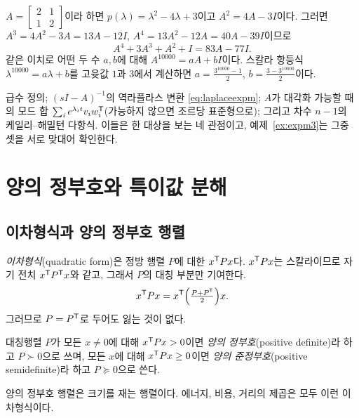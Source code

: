 \documentclass[11pt]{article}
\begin{document}
\begin{example}
$A=\begin{bmatrix}2&1\\1&2\end{bmatrix}$이라 하면 $p(\lambda)=\lambda^{2}-4\lambda+3$이고
$A^{2}=4A-3I$이다. 그러면 $A^{3}=4A^{2}-3A=13A-12I$, $A^{4}=13A^{2}-12A=40A-39I$이므로
\[
   A^{4}+3A^{3}+A^{2}+I = 83A-77I .
\]
같은 이치로 어떤 두 수 $a,b$에 대해 $A^{10000}=aA+bI$이다. 스칼라 항등식
$\lambda^{10000}=a\lambda+b$를 고윳값 $1$과 $3$에서 계산하면
$a=\frac{3^{10000}-1}{2}$, $b=\frac{3-3^{10000}}{2}$이다.
\end{example}

\begin{remark}[$e^{At}$를 계산하는 네 가지 방법]
급수 정의; $(sI-A)^{-1}$의 역라플라스 변환 \eqref{eq:laplaceexpm}; $A$가 대각화
가능할 때의 모드 합 $\sum_ie^{\lambda_it}v_iw_i^{\mathsf{T}}$(가능하지 않으면 조르당 표준형으로);
그리고 차수 $n-1$의 케일리--해밀턴 다항식. 이들은 한 대상을 보는 네 관점이고,
예제~\ref{ex:expm3}는 그중 셋을 서로 맞대어 확인한다.
\end{remark}

\section{양의 정부호와 특이값 분해}\label{sec:svd}

\subsection{이차형식과 양의 정부호 행렬}\label{sec:pd}
\emph{이차형식}(quadratic form)은 정방 행렬 $P$에 대한 $x^{\mathsf{T}} Px$다. $x^{\mathsf{T}} Px$는
스칼라이므로 자기 전치 $x^{\mathsf{T}} P^{\mathsf{T}} x$와 같고, 그래서 $P$의 대칭 부분만 기여한다.
\[
   x^{\mathsf{T}} Px = x^{\mathsf{T}}\Bigl(\tfrac{P+P^{\mathsf{T}}}{2}\Bigr)x .
\]
그러므로 $P=P^{\mathsf{T}}$로 두어도 잃는 것이 없다.
\begin{definition}[양의 정부호]
대칭행렬 $P$가 모든 $x\neq0$에 대해 $x^{\mathsf{T}} Px>0$이면 \emph{양의 정부호}(positive
definite)라 하고 $P\succ0$으로 쓰며, 모든 $x$에 대해 $x^{\mathsf{T}} Px\ge0$이면 \emph{양의
준정부호}(positive semidefinite)라 하고 $P\succeq0$으로 쓴다.
\end{definition}
양의 정부호 행렬은 크기를 재는 행렬이다. 에너지, 비용, 거리의 제곱은 모두 이런
이차형식이다.
\end{document}

